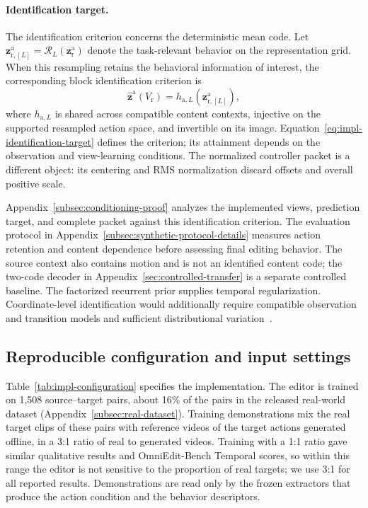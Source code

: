 \paragraph{Identification target.}
The identification criterion concerns the deterministic mean code.
Let $\mathbf z^{\mathrm a}_{\mathrm r,[L]}=\mathcal R_L(\mathbf z^{\mathrm a}_{\mathrm r})$ denote the task-relevant behavior on the
representation grid. When this resampling retains the behavioral information
of interest, the corresponding block identification criterion is
\begin{equation}
  \widehat{\mathbf z}^{\mathrm a}(V_{\mathrm r})=h_{\mathrm a,L}(\mathbf z^{\mathrm a}_{\mathrm r,[L]}),
  \label{eq:impl-identification-target}
\end{equation}
where $h_{\mathrm a,L}$ is shared across compatible content contexts,
injective on the supported resampled action space, and invertible on its
image. Equation~\ref{eq:impl-identification-target} defines the criterion;
its attainment depends on the observation and view-learning conditions.
The normalized controller packet is a different object: its centering
and RMS normalization discard offsets and overall positive scale.

Appendix~\ref{subsec:conditioning-proof} analyzes the implemented views,
prediction target, and complete packet against this identification
criterion. The evaluation protocol in Appendix~\ref{subsec:synthetic-protocol-details}
measures action retention and content dependence before assessing final
editing behavior. The source context also contains motion and is not an
identified content code; the two-code decoder in
Appendix~\ref{sec:controlled-transfer} is a separate controlled baseline.
The factorized recurrent prior supplies temporal regularization.
Coordinate-level identification would additionally require compatible
observation and transition models and sufficient distributional
variation~\citep{yao2022tdrl,shen2026covogan}.

\subsection{Reproducible configuration and input settings}
\label{subsec:impl-configuration}

Table~\ref{tab:impl-configuration} specifies the implementation. The
editor is trained on 1,508 source--target pairs, about 16\% of the pairs in
the released real-world dataset
(Appendix~\ref{subsec:real-dataset}). Training demonstrations mix the
real target clips of these pairs with reference videos of the target
actions generated offline, in a 3:1 ratio of real to generated videos.
Training with a 1:1 ratio gave similar qualitative results and
OmniEdit-Bench Temporal scores, so within this range the editor is not
sensitive to the proportion of real targets; we use 3:1 for all reported
results. Demonstrations are read only by the frozen extractors that
produce the action condition and the behavior descriptors.

